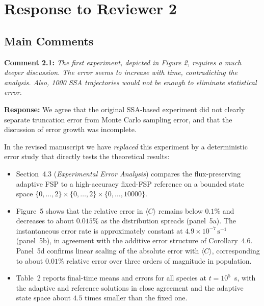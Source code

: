 \documentclass[11pt]{article}
\begin{document}
\section*{Response to Reviewer 2}

\subsection*{Main Comments}

\noindent\textbf{Comment 2.1:} \textit{The first experiment, depicted in Figure 2, requires a much deeper
discussion. The error seems to increase with time, contradicting the analysis.
Also, 1000 SSA trajectories would not be enough to eliminate statistical error.}

\textbf{Response:} We agree that the original SSA-based experiment did not clearly
separate truncation error from Monte Carlo sampling error, and that the discussion
of error growth was incomplete.

In the revised manuscript we have \emph{replaced} this experiment by a deterministic
error study that directly tests the theoretical results:

\begin{itemize}
  \item Section~4.3 (\emph{Experimental Error Analysis}) compares the
        flux-preserving adaptive FSP to a high-accuracy fixed-FSP reference on a
        bounded state space $\{0,\dots,2\}\times\{0,\dots,2\}\times\{0,\dots,10000\}$.
  \item Figure~5 shows that the relative error in $\langle C\rangle$ remains below
        $0.1\%$ and decreases to about $0.015\%$ as the distribution spreads
        (panel~5a). The instantaneous error rate is approximately constant at
        $4.9\times 10^{-7}\,\mathrm{s}^{-1}$ (panel~5b), in agreement with the
        additive error structure of Corollary~4.6. Panel~5d confirms linear
        scaling of the absolute error with $\langle C\rangle$, corresponding to
        about $0.01\%$ relative error over three orders of magnitude in
        population.
  \item Table~2 reports final-time means and errors for all species at $t=10^5$~s,
        with the adaptive and reference solutions in close agreement and the
        adaptive state space about $4.5$ times smaller than the fixed one.
\end{itemize}
\end{document}
